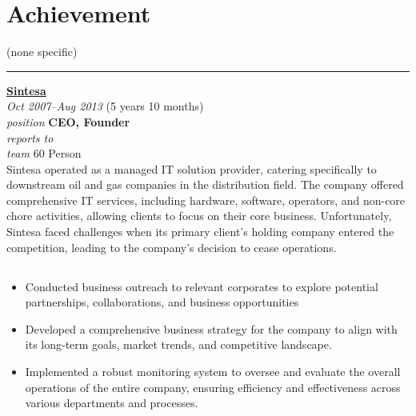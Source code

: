 \documentclass[12pt]{res}
\begin{document}
\begin{resume}
\begin{minipage}[t]{0.42\linewidth}
	\section{Achievement}
	\begin{flushleft}
        \footnotesize{\vspace{2.6pt}
(none specific)}
	\end{flushleft}
\end{minipage}

\vspace{10pt}
\rule{1.0\textwidth}{0.1pt}

\begin{multicols}{2}
	{\large {\bf \href{https://sintesatama.co.id}{Sintesa}}} \\
	{\footnotesize{\sl Oct 2007--Aug 2013} \hfill (5 years 10 months)}\\
	{\footnotesize{\sl position} \hfill \bf{CEO, Founder}}\\
	{\footnotesize{\sl reports to} \hfill }\\
	{\footnotesize{\sl team} \hfill 60 Person}\\

	\columnbreak
	{\footnotesize{Sintesa operated as a managed IT solution provider, catering specifically to downstream oil and gas companies in the distribution field. The company offered comprehensive IT services, including hardware, software, operators, and non-core chore activities, allowing clients to focus on their core business. Unfortunately, Sintesa faced challenges when its primary client's holding company entered the competition, leading to the company's decision to cease operations.}}\\
\end{multicols}
\vspace{-20pt}

\begin{multicols}{2}
	\section{}
		\begin{itemize}
			\item Conducted business outreach to relevant corporates to explore potential partnerships, collaborations, and business opportunities
\item Developed a comprehensive business strategy for the company to align with its long-term goals, market trends, and competitive landscape.
\item Implemented a robust monitoring system to oversee and evaluate the overall operations of the entire company, ensuring efficiency and effectiveness across various departments and processes.
		\end{itemize}

\end{multicols}
\end{resume}
\end{document}

